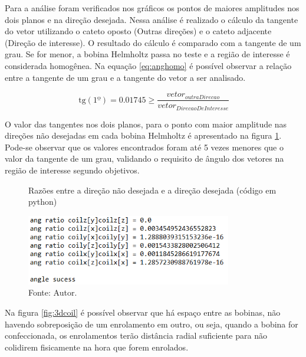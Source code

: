 Para a análise foram verificados nos gráficos os pontos de maiores amplitudes nos dois planos e na direção desejada. Nessa análise é realizado o cálculo da tangente do vetor utilizando o cateto oposto (Outras direções) e o cateto adjacente (Direção de interesse). O resultado do cálculo é comparado com a tangente de um grau. Se for menor, a bobina Helmholtz passa no teste e a região de interesse é considerada homogênea. Na equação \ref{eq:anghomo} é possível observar a relação entre a tangente de um grau e a tangente do vetor a ser analisado.

\begin{equation}
    \hspace{2pt}\textrm{tg}(1º) = 0.01745 \geq \frac{vetor_{outraDirecao}}{vetor_{DirecaoDeInteresse}}
    \label{eq:anghomo}
\end{equation}

O valor das tangentes nos dois planos, para o ponto com maior amplitude nas direções não desejadas em cada bobina Helmholtz é apresentado na figura \ref{fig:raz}. Pode-se observar que os valores encontrados foram até 5 vezes menores que o valor da tangente de um grau, validando o requisito de ângulo dos vetores na região de interesse segundo objetivos.

\begin{figure}[H]
    \centering
     \caption{Razões entre a direção não desejada e a direção desejada (código em python)}
     \includegraphics[width=0.8\textwidth]{./img/simulacao/angulo_console.png}
     \caption*{Fonte: Autor.}\label{fig:raz}
\end{figure}

Na figura \ref{fig:3dcoil} é possível observar que há espaço entre as bobinas, não havendo sobreposição de um enrolamento em outro, ou seja, quando a bobina for confeccionada, os enrolamentos terão distância radial suficiente para não colidirem fisicamente na hora que forem enrolados.

